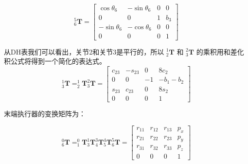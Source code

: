 \documentclass{homework}
\begin{document}
\begin{sol}
\[
  _6^5\mathbf{T} =
  \begin{bmatrix}
    \cos\theta_6 & -\sin\theta_6 & 0 & 0 \\
    0 & 0 & 1 & b_3 \\
    -\sin\theta_6 & -\cos\theta_6 & 0 & 0 \\
    0 & 0 & 0 & 1
  \end{bmatrix}
\]

从DH表我们可以看出，关节2和关节3是平行的，所以 $ _2^1\mathbf{T} $ 和 $ _3^2\mathbf{T} $ 的乘积用和差化积公式将得到一个简化的表达式。
\[
  _3^1\mathbf{T} = _2^1\mathbf{T} _3^2\mathbf{T} =
  \begin{bmatrix}
    c_{23} & -s_{23} & 0 & 8c_2 \\
    0 & 0 & -1 & - b_1 - b_2 \\
    s_{23} & c_{23} & 0 & 8s_2 \\
    0 & 0 & 0 & 1
  \end{bmatrix}
\]

末端执行器的变换矩阵为：

\[
  _6^0\mathbf{T} = _1^0\mathbf{T} _3^1\mathbf{T} _4^3\mathbf{T} _5^4\mathbf{T} _6^5\mathbf{T} =
  \begin{bmatrix} 
r_{11} & r_{12} & r_{13} & p_x \\ 
r_{21} & r_{22} & r_{23} & p_y \\ 
r_{31} & r_{32} & r_{33} & p_z \\ 
0 & 0 & 0 & 1
\end{bmatrix}
\] 


\end{sol}
\end{document}

